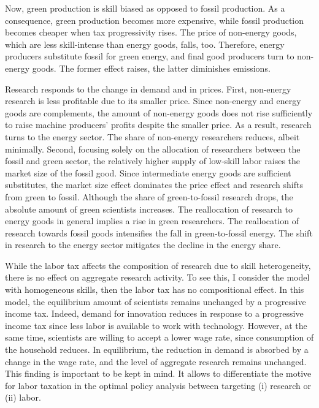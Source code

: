  
 Now, green production is skill biased as opposed to fossil production.
 As a  consequence, green production becomes more expensive, while fossil production becomes cheaper when tax progressivity rises. The price of non-energy goods, which are less skill-intense than energy goods, falls, too. Therefore, energy producers substitute fossil for green energy, and final good producers turn to non-energy goods. The former effect raises, the latter diminishes emissions.
 
 
 Research responds to the change in demand and in prices. First, non-energy research is less profitable due to its smaller price. Since non-energy and energy goods are complements, the amount of non-energy goods does not rise sufficiently to raise machine producers' profits despite the smaller price. As a result, research turns to the energy sector. The share of non-energy researchers reduces, albeit minimally. %
 Second, focusing solely on the allocation of researchers between the fossil and green sector, the relatively higher supply of low-skill labor raises the market size of the fossil good. Since intermediate energy goods are sufficient substitutes, the market size effect dominates the price effect and research shifts from green to fossil.
 Although the share of green-to-fossil research drops, the absolute amount of green scientists increases. The reallocation of research to energy goods in general implies a rise in green researchers. The reallocation of research towards fossil goods intensifies the fall in green-to-fossil energy. The shift in research to the energy sector mitigates the decline in the energy share. 
 
 While the labor tax affects the composition of research due to skill heterogeneity, there is no effect on aggregate research activity. 
 To see this, I consider the model with homogeneous skills, then the labor tax has no compositional effect. In this model, the equilibrium amount of scientists remains unchanged by a progressive income tax. Indeed, demand for innovation reduces in response to a progressive income tax since less labor is available to work with technology. However, at the same time, scientists are willing to accept a lower wage rate, since consumption of the household reduces. In equilibrium, the reduction in demand is absorbed by a change in the wage rate, and the level of aggregate research remains unchanged. 
 This finding is important to be kept in mind. It allows to differentiate the motive for labor taxation in the optimal policy analysis between  targeting (i) research or (ii) labor. 
 
